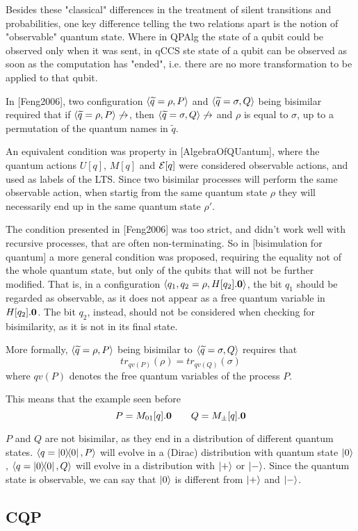 Besides these "classical" differences in the treatment of silent transitions and probabilities, one key difference telling the two relations apart is the notion of "observable" quantum state. Where in QPAlg the state of a qubit could be observed only when it was sent, in qCCS ste state of a qubit can be observed as soon as the computation has "ended", i.e. there are no more transformation to be applied to that qubit.

In  [Feng2006], two configuration $\langle\widetilde{q} = \rho, P\rangle$ and $\langle\widetilde{q} = \sigma, Q\rangle$ being bisimilar required that if $\langle\widetilde{q} = \rho, P\rangle \not\rightarrow$, then $\langle\widetilde{q} = \sigma, Q\rangle \not\rightarrow$ and $\rho$ is equal to $\sigma$, up to a permutation of the quantum names in $\widetilde{q}$. 

An equivalent condition was property in [AlgebraOfQUantum], where the quantum actions $U[q]$, $M[q]$ and $\mathcal{E}[q]$ were considered observable actions, and used as labels of the LTS. Since two bisimilar processes will perform the same observable action, when startig from the same quantum state $\rho$ they will necessarily end up in the same quantum state $\rho'$.

The condition presented in [Feng2006] was too strict, and didn't work well with recursive processes, that are often non-terminating. So in [bisimulation for quantum] a more general condition was proposed, requiring the equality not of the whole quantum state, but only of the qubits that will not be further modified. That is, in a configuration $\langle q_1, q_2 = \rho, H[q_2].\mathbf{0}\rangle$, the bit $q_1$ should be regarded as observable, as it does not appear as a free quantum variable in $H[q_2].\mathbf{0}$. The bit $q_2$, instead, should not be considered when checking for bisimilarity, as it is not in its final state.

More formally, $\langle\widetilde{q} = \rho, P\rangle $ being bisimilar to $\langle\widetilde{q} = 	\sigma, Q\rangle$ requires that 
\[tr_{qv(P)}(\rho) = tr_{qv(Q)}(\sigma)\]
where $qv(P)$ denotes the free quantum variables of the process $P$.

This means that the example seen before
\[ P = M_{01}[q].\mathbf{0} \qquad Q = M_\pm[q].\mathbf{0}\]

$P$ and $Q$ are not bisimilar, as they end in a distribution of different quantum states. $\langle q = \ket{0}\!\!\bra{0}, P\rangle$ will evolve in a (Dirac) distribution with quantum state $\ket{0}$, $\langle q = \ket{0}\!\!\bra{0}, Q\rangle$ will evolve in a distribution with $\ket{+}$ or $\ket{-}$. Since the quantum state is observable, we can say that $\ket{0}$ is different from $\ket{+}$ and $\ket{-}$.

\subsection{CQP}